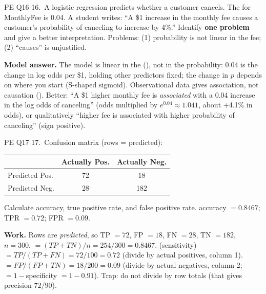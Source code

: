 \begin{qbox}{PE Q16}
16.~A logistic regression predicts whether a customer cancels. The  for MonthlyFee is 0.04. A student writes: ``A \$1 increase in the monthly fee causes a customer's probability of canceling to increase by 4\%.'' Identify \textbf{one problem} and give a better interpretation.
\ans Problems: (1) probability is not linear in the fee; (2) ``causes'' is unjustified.\par
\textbf{Model answer.} The model is linear in the  (), not in the probability: 0.04 is the change in log odds per \$1, holding other predictors fixed; the change in $p$ depends on where you start (S-shaped sigmoid). Observational data gives association, not causation (). Better: ``A \$1 higher monthly fee is \emph{associated} with a 0.04 increase in the log odds of canceling'' (odds multiplied by $e^{0.04}\approx1.041$, about +4.1\% in odds), or qualitatively ``higher fee is associated with higher probability of canceling'' (sign positive). 
\end{qbox}

\begin{qbox}{PE Q17}
17.~Confusion matrix (rows = predicted):\par
{\small\begin{tabular}{@{}lcc@{}}\toprule
 & Actually Pos. & Actually Neg.\\\midrule
Predicted Pos. & 72 & 18\\ Predicted Neg. & 28 & 182\\\bottomrule\end{tabular}}\par
Calculate accuracy, true positive rate, and false positive rate.
\ans accuracy $=0.8467$; TPR $=0.72$; FPR $=0.09$.\par
\textbf{Work.} Rows are \emph{predicted}, so TP $=72$, FP $=18$, FN $=28$, TN $=182$, $n=300$.  $=(TP+TN)/n=254/300=0.8467$.  (sensitivity) $=TP/(TP+FN)=72/100=0.72$ (divide by actual positives, column 1).  $=FP/(FP+TN)=18/200=0.09$ (divide by actual negatives, column 2; $=1-$specificity $=1-0.91$). Trap: do not divide by row totals (that gives precision $72/90$). 
\end{qbox}

